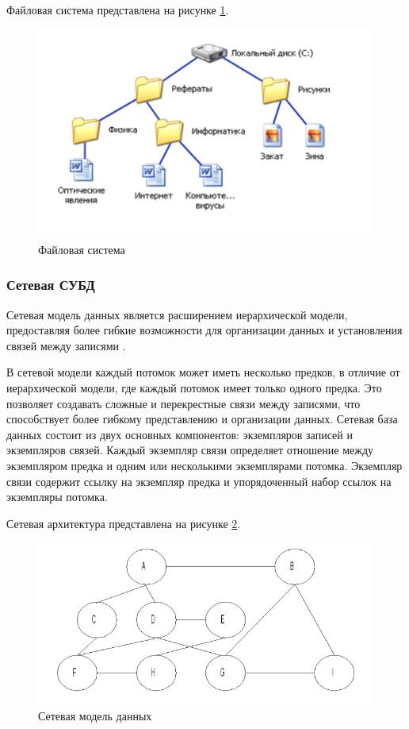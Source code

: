 Файловая система представлена на рисунке \ref{img:pic1}.
\begin{figure}[h!]
	\centering
	\includegraphics[height=0.3\textheight]{img/pic1} %
	\caption{Файловая система}
	\label{img:pic1}
\end{figure}

\subsubsection{Сетевая СУБД}

Сетевая модель данных является расширением иерархической модели, предоставляя более гибкие возможности для организации данных и установления связей между записями \cite{instument}.

В сетевой модели каждый потомок может иметь несколько предков, в отличие от иерархической модели, где каждый потомок имеет только одного предка.
Это позволяет создавать сложные и перекрестные связи между записями, что способствует более гибкому представлению и организации данных.
Сетевая база данных состоит из двух основных компонентов: экземпляров записей и экземпляров связей.
Каждый экземпляр связи определяет отношение между экземпляром предка и одним или несколькими экземплярами потомка.
Экземпляр связи содержит ссылку на экземпляр предка и упорядоченный набор ссылок на экземпляры потомка.

Сетевая архитектура представлена на рисунке \ref{img:pic2}.
\begin{figure}[h!]
	\centering
	\includegraphics[height=0.3\textheight]{img/pic2} %
	\caption{Сетевая модель данных}
	\label{img:pic2}
\end{figure}

